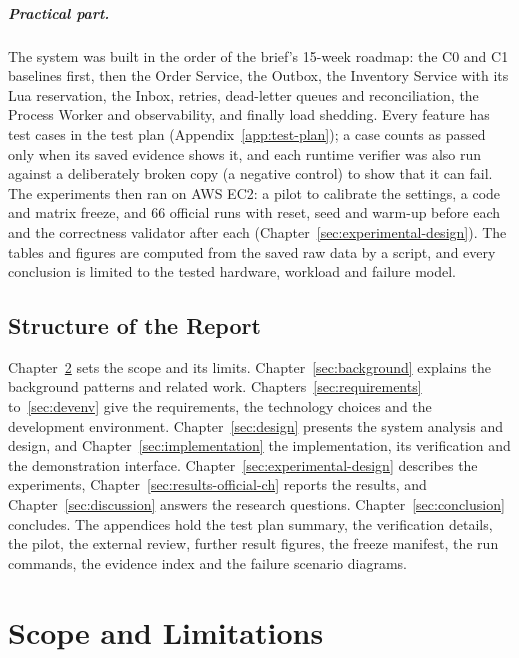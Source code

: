 \documentclass[a4paper]{report}
\begin{document}
\paragraph{Practical part.} The system was built in the order of the brief's
15-week roadmap: the C0 and C1 baselines first, then the Order Service, the
Outbox, the Inventory Service with its Lua reservation, the Inbox, retries,
dead-letter queues and reconciliation, the Process Worker and observability,
and finally load shedding. Every feature has test cases in the test plan
(Appendix~\ref{app:test-plan}); a case counts as passed only when its saved
evidence shows it, and each runtime verifier was also run against a
deliberately broken copy (a negative control) to show that it can fail. The
experiments then ran on AWS EC2: a pilot to calibrate the settings, a code and
matrix freeze, and 66 official runs with reset, seed and warm-up before each
and the correctness validator after each (Chapter~\ref{sec:experimental-design}).
The tables and figures are computed from the saved raw data by a script, and
every conclusion is limited to the tested hardware, workload and failure model.

\section{Structure of the Report}

Chapter~\ref{sec:scope} sets the scope and its limits.
Chapter~\ref{sec:background} explains the background patterns and related work.
Chapters~\ref{sec:requirements} to~\ref{sec:devenv} give the requirements, the
technology choices and the development environment.
Chapter~\ref{sec:design} presents the system analysis and design, and
Chapter~\ref{sec:implementation} the implementation, its verification and the
demonstration interface. Chapter~\ref{sec:experimental-design} describes the
experiments, Chapter~\ref{sec:results-official-ch} reports the results, and
Chapter~\ref{sec:discussion} answers the research questions.
Chapter~\ref{sec:conclusion} concludes. The appendices hold the test plan
summary, the verification details, the pilot, the external review, further
result figures, the freeze manifest, the run commands, the evidence index and
the failure scenario diagrams.

\chapter{Scope and Limitations}
\label{sec:scope}
\end{document}
